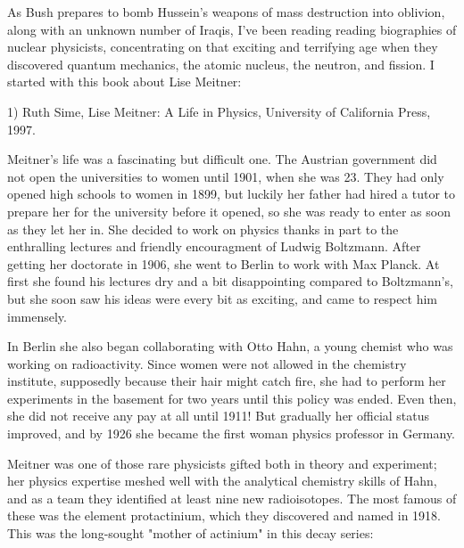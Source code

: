 




As Bush prepares to bomb Hussein's weapons of mass destruction into
oblivion, along with an unknown number of Iraqis, I've been reading
reading biographies of nuclear physicists, concentrating on that
exciting and terrifying age when they discovered quantum mechanics, 
the atomic nucleus, the neutron, and fission.  I started with this book
about Lise Meitner:

1) Ruth Sime, Lise Meitner: A Life in Physics, University of California
Press, 1997.

Meitner's life was a fascinating but difficult one.  The Austrian
government did not open the universities to women until 1901, when she
was 23.  They had only opened high schools to women in 1899, but
luckily her father had hired a tutor to prepare her for the university
before it opened, so she was ready to enter as soon as they let her in.
She decided to work on physics thanks in part to the enthralling
lectures and friendly encouragment of Ludwig Boltzmann.  After getting
her doctorate in 1906, she went to Berlin to work with Max Planck.  At
first she found his lectures dry and a bit disappointing compared to
Boltzmann's, but she soon saw his ideas were every bit as exciting, and
came to respect him immensely.

In Berlin she also began collaborating with Otto Hahn, a young chemist
who was working on radioactivity.  Since women were not allowed in the
chemistry institute, supposedly because their hair might catch fire,
she had to perform her experiments in the basement for two years until
this policy was ended.  Even then, she did not receive any pay at all
until 1911!  But gradually her official status improved, and by 1926 she
became the first woman physics professor in Germany.

Meitner was one of those rare physicists gifted both in theory and
experiment; her physics expertise meshed well with the analytical
chemistry skills of Hahn, and as a team they identified at least nine
new radioisotopes.  The most famous of these was the element
protactinium, which they discovered and named in 1918.  This was the
long-sought "mother of actinium" in this decay series:

